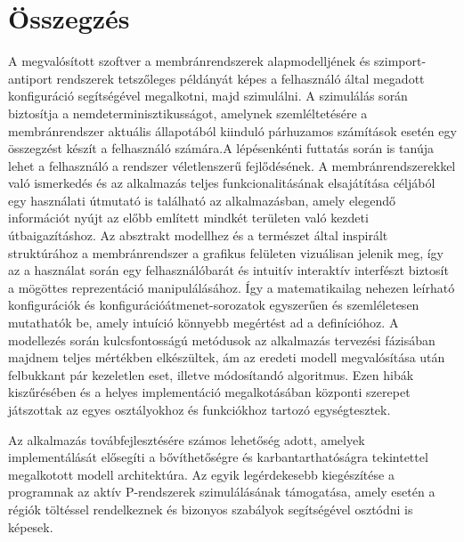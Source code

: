 \chapter{Összegzés}
\label{ch:sum}
A megvalósított szoftver a membránrendszerek alapmodelljének és szimport-antiport rendszerek tetszőleges példányát képes a felhasználó által megadott konfiguráció segítségével megalkotni, majd szimulálni.  A szimulálás során biztosítja a nemdeterminisztikusságot, amelynek szemléltetésére a membránrendszer aktuális állapotából kiinduló párhuzamos számítások esetén egy összegzést készít a felhasználó számára.A lépésenkénti futtatás során is tanúja lehet a felhasználó a rendszer véletlenszerű fejlődésének.
A membránrendszerekkel való ismerkedés és az alkalmazás teljes funkcionalitásának elsajátítása céljából egy használati útmutató is található az alkalmazásban, amely elegendő információt nyújt az előbb említett mindkét területen való kezdeti útbaigazításhoz. Az absztrakt modellhez és a természet által inspirált struktúrához a membránrendszer a grafikus felületen vizuálisan jelenik meg, így az a használat során egy felhasználóbarát és intuitív interaktív interfészt biztosít a mögöttes reprezentáció manipulálásához. Így a matematikailag nehezen leírható konfigurációk és konfigurációátmenet-sorozatok egyszerűen és szemléletesen mutathatók be, amely intuíció könnyebb megértést ad a definícióhoz.
A modellezés során kulcsfontosságú metódusok az alkalmazás tervezési fázisában majdnem teljes mértékben elkészültek, ám az eredeti modell megvalósítása után felbukkant pár kezeletlen eset, illetve  módosítandó algoritmus. Ezen hibák kiszűrésében és a helyes implementáció megalkotásában központi szerepet játszottak az egyes osztályokhoz és funkciókhoz tartozó egységtesztek.

Az alkalmazás továbfejlesztésére számos lehetőség adott, amelyek implementálását elősegíti a bővíthetőségre és karbantarthatóságra tekintettel megalkotott modell architektúra. Az egyik legérdekesebb kiegészítése a programnak az aktív P-rendszerek szimulálásának támogatása, amely esetén a régiók töltéssel rendelkeznek és bizonyos szabályok segítségével osztódni is képesek.